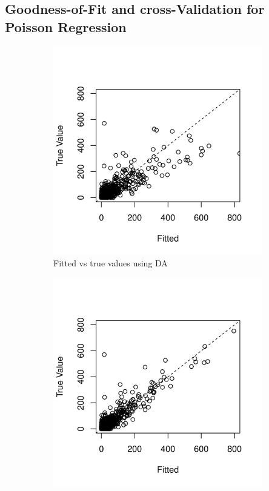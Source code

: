 \documentclass[10pt]{article}
\begin{document}
\subsection{Goodness-of-Fit and cross-Validation for Poisson Regression}


 \begin{figure}[H]
   \begin{subfigure}[b]{0.45\textwidth}
 \includegraphics[width=1\textwidth]{poisson_fitting_da.png}
 \caption{Fitted vs true values using DA}
 \end{subfigure}
  \hfill 
 \begin{subfigure}[b]{0.45\textwidth}
 \includegraphics[width=1\textwidth]{poisson_fitting_ada.png}

\end{subfigure}
\end{figure}
\end{document}
